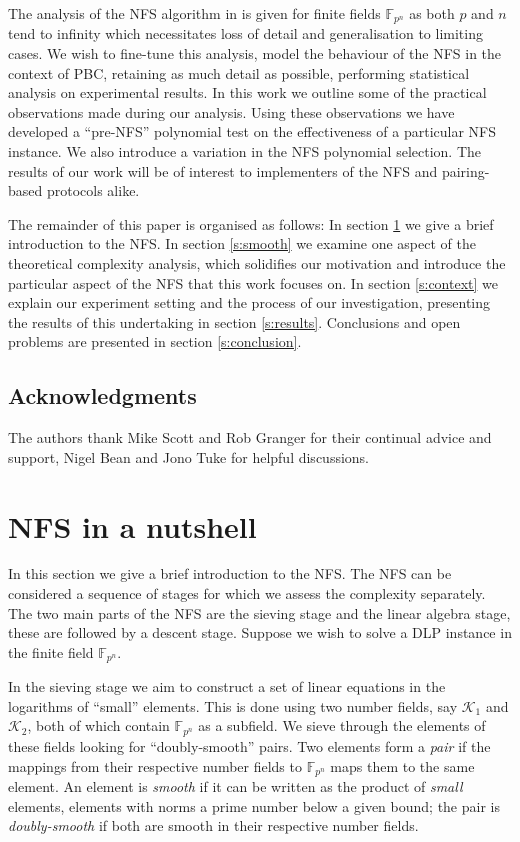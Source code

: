 \documentclass[a4paper, 12pt, envcountsect, runningheads]{llncs}
\newcommand{\F}{{\mathbb F}}
\numberwithin{figure}{section}
\numberwithin{equation}{section}
\begin{document}
The analysis of the NFS algorithm in \cite{joux-lercier-smart-vercauteren06} is given for finite fields $\F_{p^n}$ as both $p$ and $n$ tend to infinity which necessitates loss of detail and generalisation to limiting cases. We wish to fine-tune this analysis, model the behaviour of the NFS in the context of  PBC, retaining as much detail as possible, performing statistical analysis on experimental results. In this work we outline some of the practical observations made during our analysis. Using these observations we have developed a ``pre-NFS'' polynomial test on the effectiveness of a particular NFS instance. We also introduce a variation in the NFS polynomial selection. The results of our work will be of interest to implementers of the NFS and pairing-based protocols alike. 

The remainder of this paper is organised as follows: In section \ref{s:nfs} we give a brief introduction to the NFS. In section \ref{s:smooth} we examine one aspect of the theoretical complexity analysis, which solidifies our motivation and introduce the particular aspect of the NFS that this work focuses on. In section \ref{s:context} we explain our experiment setting and the process of our investigation, presenting the results of this undertaking in section \ref{s:results}. Conclusions and open problems are presented in section \ref{s:conclusion}.
\subsection*{Acknowledgments}
The authors thank Mike Scott and Rob Granger for their continual advice and support, Nigel Bean and Jono Tuke for helpful discussions.

\section{NFS in a nutshell} 
\label{s:nfs}
In this section we give a brief introduction to the NFS. The NFS can be considered a sequence of stages for which we assess the complexity separately. The two main parts of the NFS are the sieving stage and the linear algebra stage, these are followed by a descent stage. Suppose we wish to solve a DLP instance in the finite field $\F_{p^n}.$

In the sieving stage we aim to construct a set of linear equations in the logarithms of ``small'' elements. This is done using two number fields, say $\mathcal{K}_{1}$ and $\mathcal{K}_{2}$, both of which contain $\F_{p^n}$ as a subfield. We sieve through the elements of these fields looking for ``doubly-smooth'' pairs. Two elements form a {\em pair} if the mappings from their respective number fields to $\F_{p^n}$ maps them to the same element. An element is {\em smooth} if it can be written as the product of {\em small} elements, elements with norms a prime number below a given bound; the pair is {\em doubly-smooth} if both are smooth in their respective number fields. 
\end{document}
